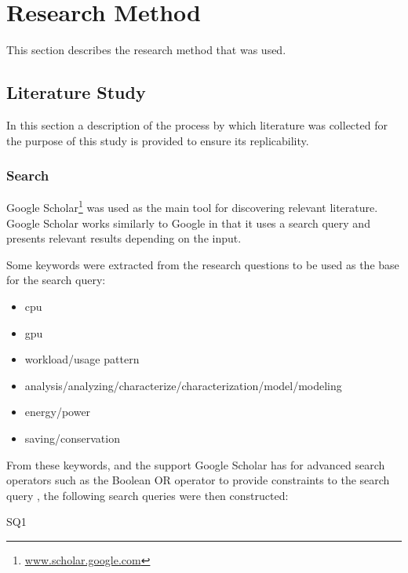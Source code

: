 \section{Research Method}
	This section describes the research method that was used.

	\subsection{Literature Study}
		In this section a description of the process by which literature was collected for the purpose of this study is provided to ensure its replicability.

		\subsubsection{Search}
			Google Scholar\footnote{\url{www.scholar.google.com}} was used as the main tool for discovering relevant literature.
			Google Scholar works similarly to Google in that it uses a search query and presents relevant results depending on the input.
		
			Some keywords were extracted from the research questions to be used as the base for the search query:
			\begin{itemize}
				\item \acrshort{cpu}
				\item \acrshort{gpu}
				\item workload/usage pattern
				\item analysis/analyzing/characterize/characterization/model/modeling
				\item energy/power
				\item saving/conservation
			\end{itemize}
		
			From these keywords, and the support Google Scholar has for advanced search operators such as the Boolean OR operator to provide constraints to the search query \parencite{Russel}, the following search queries were then constructed:
			\begin{aligneddescription}{SQ1}
				\item[SQ1] \sqOne
				\item[SQ2] \sqTwo
			\end{aligneddescription}
			
